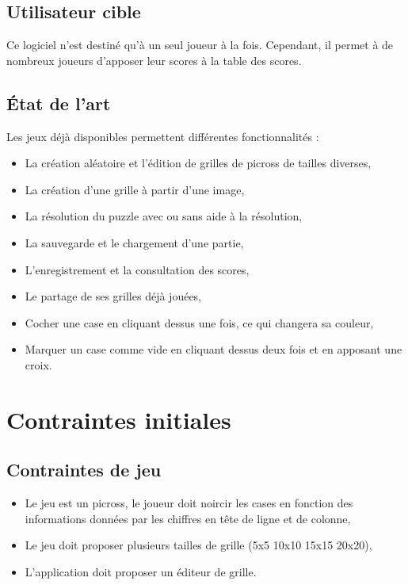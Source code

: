 \documentclass[11pt]{article}
\begin{document}
\subsection{Utilisateur cible}

Ce logiciel n'est destiné qu'à un seul joueur à la fois. Cependant, il permet à de nombreux joueurs d'apposer leur
scores à la table des scores.


\subsection{État de l'art}

Les jeux déjà disponibles permettent différentes fonctionnalités :
\begin{itemize}
   \item La création aléatoire et l'édition de grilles de picross de tailles diverses,
   \item La création d'une grille à partir d'une image,
   \item La résolution du puzzle avec ou sans aide à la résolution,
   \item La sauvegarde et le chargement d'une partie,
   \item L'enregistrement et la consultation des scores,
   \item Le partage de ses grilles déjà jouées,
   \item Cocher une case en cliquant dessus une fois, ce qui changera sa couleur,
   \item Marquer un case comme vide en cliquant dessus deux fois et en apposant une croix.
\end{itemize}




\section{Contraintes initiales}


\subsection{Contraintes de jeu}


\begin{itemize}
   \item Le jeu est un picross, le joueur doit noircir les cases en fonction des informations données par les chiffres en
       tête de ligne et de colonne,
   \item Le jeu doit proposer plusieurs tailles de grille (5x5 10x10 15x15 20x20),
   \item L'application doit proposer un éditeur de grille.
\end{itemize}
\end{document}
